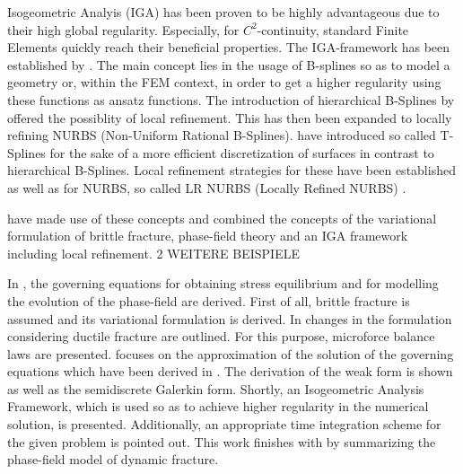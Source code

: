 Isogeometric Analyis (IGA) has been proven to be highly advantageous due to their high global regularity. Especially, for $C^{2}$-continuity, standard Finite Elements quickly reach their beneficial properties. The IGA-framework has been established by \citet{09_B_IGA1}. The main concept lies in the usage of B-splines so as to model a geometry or, within the FEM context, in order to get a higher regularity using these functions as ansatz functions. The introduction of hierarchical B-Splines by \citet{18_IGA_HierBSplines} offered the possiblity of local refinement. This has then been expanded to locally refining NURBS (Non-Uniform Rational B-Splines). \citet{16_IGA_TSplines} have introduced so called T-Splines for the sake of a more efficient discretization of surfaces in contrast to hierarchical B-Splines. Local refinement strategies for these have been established as well as for NURBS, so called LR NURBS (Locally Refined NURBS) \cite{17_IGA_LRNURBS}.

\citep{01_PF_dyn_brittle} have made use of these concepts and combined the concepts of the variational formulation of brittle fracture, phase-field theory and an IGA framework \citet{09_B_IGA1} including local refinement. 2 WEITERE BEISPIELE





In , the governing equations for obtaining stress equilibrium and for modelling the evolution of the phase-field are derived. First of all, brittle fracture is assumed and its variational formulation is derived. In  changes in the formulation considering ductile fracture are outlined. For this purpose, microforce balance laws are presented.   focuses on the approximation of the solution of the governing equations which have been derived in . The derivation of the weak form is shown as well as the semidiscrete Galerkin form. Shortly, an Isogeometric Analysis Framework, which is used so as to achieve higher regularity in the numerical solution, is presented. Additionally, an appropriate time integration scheme for the given problem is pointed out. This work finishes with  by summarizing the phase-field model of dynamic fracture.





